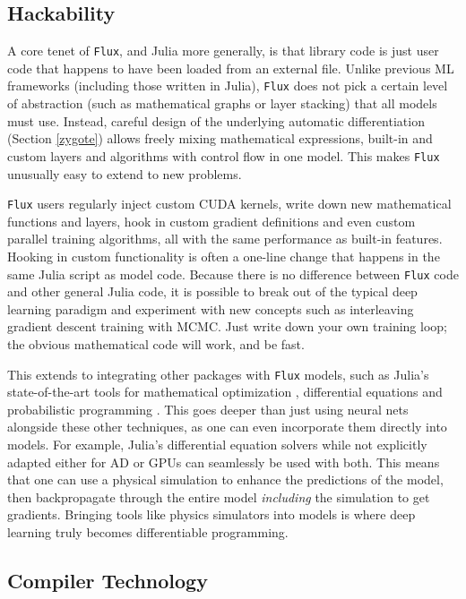 \documentclass{juliacon}
\begin{document}
\subsection{Hackability}
\label{Hacka}

A core tenet of \texttt{Flux}, and Julia more generally, is that library code is just user code that happens to have been loaded from an external file. Unlike previous ML frameworks (including those written in Julia), \texttt{Flux} does not pick a certain level of abstraction (such as mathematical graphs or layer stacking) that all models must use. Instead, careful design of the underlying automatic differentiation (Section \ref{zygote}) allows freely mixing mathematical expressions, built-in and custom layers and algorithms with control flow in one model. This makes \texttt{Flux} unusually easy to extend to new problems.

\texttt{Flux} users regularly inject custom CUDA kernels, write down new mathematical functions and layers, hook in custom gradient definitions and even custom parallel training algorithms, all with the same performance as built-in features.  Hooking in custom functionality is often a one-line change that happens in the same Julia script as model code.  Because there is no difference between \texttt{Flux} code and other general Julia code, it is possible to break out of the typical deep learning paradigm and experiment with new concepts such as interleaving gradient descent training with MCMC.  Just write down your own training loop; the obvious mathematical code will work, and be fast.

This extends to integrating other packages with \texttt{Flux} models, such as Julia's state-of-the-art tools for mathematical optimization \cite{dunning2017jump}, differential equations \cite{rackauckas2017differentialequations} and probabilistic programming \cite{turing18}. This goes deeper than just using neural nets alongside these other techniques, as one can even incorporate them directly into models. For example, Julia's differential equation solvers while not explicitly adapted either for AD or GPUs can seamlessly be used with both. This means that one can use a physical simulation to enhance the predictions of the model, then backpropagate through the entire model \textit{including} the simulation to get gradients.  Bringing tools like physics simulators into models is where deep learning truly becomes differentiable programming.

\subsection{Compiler Technology}
\label{Compiler}
\end{document}

